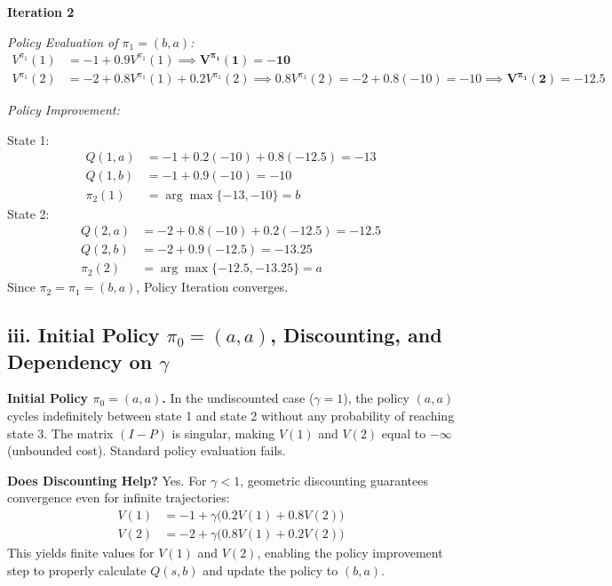 \documentclass[11pt]{article}
\begin{document}
\textbf{Iteration 2}

\emph{Policy Evaluation of $\pi_1 = (b, a)$:}
\begin{align*}
V^{\pi_1}(1) &= -1 + 0.9 V^{\pi_1}(1) \implies \mathbf{V^{\pi_1}(1) = -10} \\
V^{\pi_1}(2) &= -2 + 0.8 V^{\pi_1}(1) + 0.2 V^{\pi_1}(2) \implies 0.8 V^{\pi_1}(2) = -2 + 0.8(-10) = -10 \implies \mathbf{V^{\pi_1}(2) = -12.5}
\end{align*}

\emph{Policy Improvement:}

State 1:
\begin{align*}
Q(1, a) &= -1 + 0.2(-10) + 0.8(-12.5) = -13 \\
Q(1, b) &= -1 + 0.9(-10) = -10 \\
\pi_2(1) &= \arg\max \{-13, -10\} = b
\end{align*}
State 2:
\begin{align*}
Q(2, a) &= -2 + 0.8(-10) + 0.2(-12.5) = -12.5 \\
Q(2, b) &= -2 + 0.9(-12.5) = -13.25 \\
\pi_2(2) &= \arg\max \{-12.5, -13.25\} = a
\end{align*}
Since $\pi_2 = \pi_1 = (b, a)$, Policy Iteration converges.

\begin{center}
\end{center}

\subsection*{iii. Initial Policy $\pi_0 = (a, a)$, Discounting, and Dependency on $\gamma$}

\textbf{Initial Policy $\pi_0 = (a, a)$.} In the undiscounted case ($\gamma = 1$), the policy
$(a, a)$ cycles indefinitely between state 1 and state 2 without any probability of
reaching state 3. The matrix $(I - P)$ is singular, making $V(1)$ and $V(2)$ equal to
$-\infty$ (unbounded cost). Standard policy evaluation fails.

\textbf{Does Discounting Help?} Yes. For $\gamma < 1$, geometric discounting guarantees
convergence even for infinite trajectories:
\begin{align*}
V(1) &= -1 + \gamma\big(0.2 V(1) + 0.8 V(2)\big) \\
V(2) &= -2 + \gamma\big(0.8 V(1) + 0.2 V(2)\big)
\end{align*}
This yields finite values for $V(1)$ and $V(2)$, enabling the policy improvement step to
properly calculate $Q(s, b)$ and update the policy to $(b, a)$.
\end{document}
